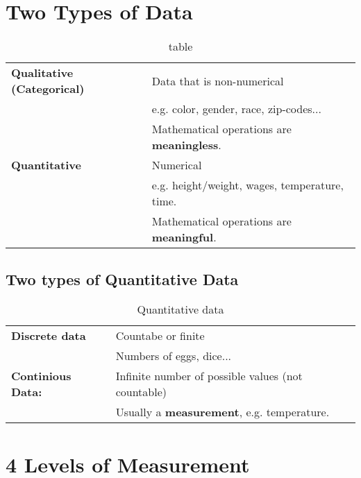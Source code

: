 \documentclass{book}
\begin{document}
\section{Two Types of Data}

\begin{table}[htbp]
    \centering
    \begin{tabular}{>{\bfseries}l l}
        \toprule
        Qualitative (Categorical) & Data that is non-numerical \\
                                  & e.g. color, gender, race, zip-codes...\\
                                  & Mathematical operations are \textbf{meaningless}.\\
        \midrule
        Quantitative & Numerical \\
                     & e.g. height/weight, wages, temperature, time.  \\
                     & Mathematical operations are \textbf{meaningful}.  \\
        \bottomrule
    \end{tabular}
    \caption{table}
    \label{tab:vocab-3}
\end{table}

\clearpage


\subsection{Two types of Quantitative Data}

\begin{table}[htbp]
    \centering
    \begin{tabular}{>{\bfseries}l l}
        \toprule
        Discrete data & Countabe or finite \\
                      & Numbers of eggs, dice... \\
                      \midrule
        Continious Data: & Infinite number of possible values (not countable) \\
                         & Usually a \textbf{measurement}, e.g. temperature. \\
                         \bottomrule
    \end{tabular}
    \caption{Quantitative data}
    \label{tab:vocab-4}
\end{table}

\section{4 Levels of Measurement}
\end{document}

